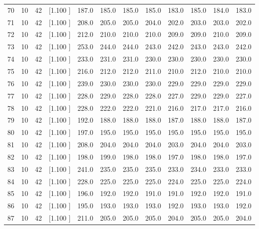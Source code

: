 \documentclass[12pt,a4paper]{article}
\begin{document}
\begin{center}
{\begin{tabular}{r r r r r r r r r r r r}
  70& 10& 42&[1.100     ]&   187.0&   185.0&   185.0&   185.0&   183.0&   185.0&   184.0&   183.0\\[-0.02in]
  71& 10& 42&[1.100     ]&   208.0&   205.0&   205.0&   204.0&   202.0&   203.0&   203.0&   202.0\\[-0.02in]
  72& 10& 42&[1.100     ]&   212.0&   210.0&   210.0&   210.0&   209.0&   209.0&   210.0&   209.0\\[-0.02in]
  73& 10& 42&[1.100     ]&   253.0&   244.0&   244.0&   243.0&   242.0&   243.0&   243.0&   242.0\\[-0.02in]
  74& 10& 42&[1.100     ]&   233.0&   231.0&   231.0&   230.0&   230.0&   230.0&   230.0&   230.0\\[-0.02in]
  75& 10& 42&[1.100     ]&   216.0&   212.0&   212.0&   211.0&   210.0&   212.0&   210.0&   210.0\\[-0.02in]
  76& 10& 42&[1.100     ]&   239.0&   230.0&   230.0&   230.0&   229.0&   229.0&   229.0&   229.0\\[-0.02in]
  77& 10& 42&[1.100     ]&   228.0&   229.0&   228.0&   228.0&   227.0&   229.0&   229.0&   227.0\\[-0.02in]
  78& 10& 42&[1.100     ]&   228.0&   222.0&   222.0&   221.0&   216.0&   217.0&   217.0&   216.0\\[-0.02in]
  79& 10& 42&[1.100     ]&   192.0&   188.0&   188.0&   188.0&   187.0&   188.0&   188.0&   187.0\\[-0.02in]
  80& 10& 42&[1.100     ]&   197.0&   195.0&   195.0&   195.0&   195.0&   195.0&   195.0&   195.0\\[-0.02in]
  81& 10& 42&[1.100     ]&   208.0&   204.0&   204.0&   204.0&   203.0&   204.0&   204.0&   203.0\\[-0.02in]
  82& 10& 42&[1.100     ]&   198.0&   199.0&   198.0&   198.0&   197.0&   198.0&   198.0&   197.0\\[-0.02in]
  83& 10& 42&[1.100     ]&   241.0&   235.0&   235.0&   235.0&   233.0&   234.0&   233.0&   233.0\\[-0.02in]
  84& 10& 42&[1.100     ]&   228.0&   225.0&   225.0&   225.0&   224.0&   225.0&   225.0&   224.0\\[-0.02in]
  85& 10& 42&[1.100     ]&   196.0&   192.0&   192.0&   191.0&   191.0&   192.0&   192.0&   191.0\\[-0.02in]
  86& 10& 42&[1.100     ]&   195.0&   193.0&   193.0&   193.0&   192.0&   193.0&   193.0&   192.0\\[-0.02in]
  87& 10& 42&[1.100     ]&   211.0&   205.0&   205.0&   205.0&   204.0&   205.0&   205.0&   204.0\\[-0.02in]

\end{tabular}}
\end{center}
\end{document}
